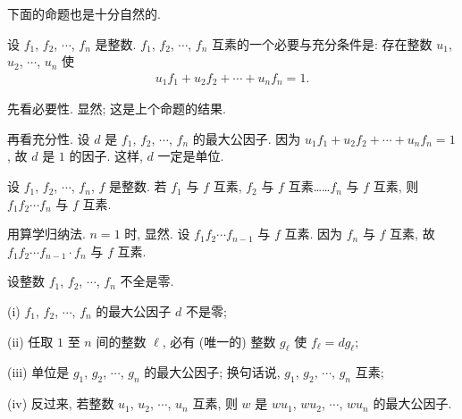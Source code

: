 下面的命题也是十分自然的.
\begin{proposition}
    设 $f_1$, $f_2$, $\cdots$, $f_n$ 是整数. $f_1$, $f_2$, $\cdots$, $f_n$ 互素的一个必要与充分条件是: 存在整数 $u_1$, $u_2$, $\cdots$, $u_n$ 使
    \begin{align*}
        u_1 f_1 + u_2 f_2 + \cdots + u_n f_n = 1.
    \end{align*}
\end{proposition}

\begin{pf}
    先看必要性. 显然; 这是上个命题的结果.

    再看充分性. 设 $d$ 是 $f_1$, $f_2$, $\cdots$, $f_n$ 的最大公因子. 因为 $u_1 f_1 + u_2 f_2 + \cdots + u_n f_n = 1$, 故 $d$ 是 $1$ 的因子. 这样, $d$ 一定是单位.
\end{pf}

\begin{proposition}
    设 $f_1$, $f_2$, $\cdots$, $f_n$, $f$ 是整数. 若 $f_1$ 与 $f$ 互素, $f_2$ 与 $f$ 互素……$f_n$ 与 $f$ 互素, 则 $f_1 f_2 \cdots f_n$ 与 $f$ 互素.
\end{proposition}

\begin{pf}
    用算学归纳法. $n = 1$ 时, 显然. 设 $f_1 f_2 \cdots f_{n-1}$ 与 $f$ 互素. 因为 $f_n$ 与 $f$ 互素, 故 $f_1 f_2 \cdots f_{n-1} \cdot f_n$ 与 $f$ 互素.
\end{pf}

\begin{proposition}
    设整数 $f_1$, $f_2$, $\cdots$, $f_n$ 不全是零.

    (i) $f_1$, $f_2$, $\cdots$, $f_n$ 的最大公因子 $d$ 不是零;

    (ii) 任取 $1$ 至 $n$ 间的整数 $\ell$, 必有 (唯一的) 整数 $g_\ell$ 使 $f_\ell = dg_\ell$;

    (iii) 单位是 $g_1$, $g_2$, $\cdots$, $g_n$ 的最大公因子; 换句话说, $g_1$, $g_2$, $\cdots$, $g_n$ 互素;

    (iv) 反过来, 若整数 $u_1$, $u_2$, $\cdots$, $u_n$ 互素, 则 $w$ 是 $wu_1$, $wu_2$, $\cdots$, $wu_n$ 的最大公因子.
\end{proposition}

